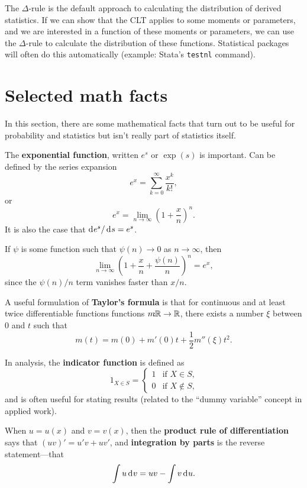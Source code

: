 \documentclass[twoside]{article}
\begin{document}
The $\Delta$-rule is the default approach to calculating the distribution of derived
statistics. If we can show that the CLT applies to some moments or parameters,
and we are interested in a function of these moments or parameters, we can use the 
$\Delta$-rule to calculate the distribution of these functions. Statistical packages
will often do this automatically (example: Stata's \texttt{testnl} command).

\section{Selected math facts}
In this section, there are some mathematical facts that turn out to be useful
for probability and statistics but isn't really part of statistics itself.

The \textbf{exponential function}, written $e^s$ or $\exp(s)$ is important. Can be defined by the
series expansion \[ e^x = \sum_{k=0}^\infty \frac{x^k}{k!},\] or
\[ e^x = \lim_{n\rightarrow \infty} \left( 1 + \frac{x}{n} \right)^n. \]
It is also the case that  $\rd e^s / \rd s =e^s$.


If $\psi$ is some function such that $\psi(n) \rightarrow 0$ as $n\rightarrow\infty$,
then \[ \lim_{n\rightarrow\infty} \left(1 + \frac{x}{n} + \frac{\psi(n)}{n}  \right)^n = e^x,\]
since the $\psi(n)/n$ term vanishes faster than $x/n$.

A useful formulation of \textbf{Taylor's formula} is that for continuous and at
least twice differentiable functions functions $m\!\!\!:\!\!\mathbb{R} \rightarrow \mathbb{R}$, there
exists a number $\xi$ between $0$ and $t$ such that \[ m(t) = m(0) + m'(0) t +
\frac{1}{2} m''(\xi) t^2.\]

In analysis, the \textbf{indicator function} is defined as 
\[ 1_{X\in S} = \begin{cases} 1 & \text{if $X\in S$,} \\ 0 & \text{if $X\notin S$,}\end{cases}\]
and is often useful for stating results (related to the ``dummy variable'' concept in applied work).

When $u=u(x)$ and $v=v(x)$, then the \textbf{product rule of differentiation}
says that $(u v)' = u'v + u v'$,  and \textbf{integration by parts} is the reverse statement---that
\[\int u \rd v = u v - \int v \rd u. \]
\end{document}
